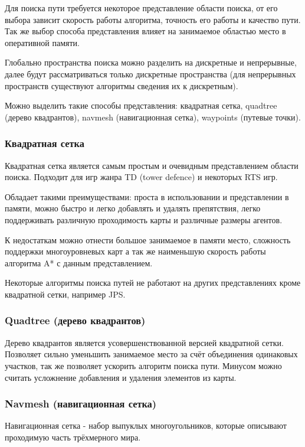 Для поиска пути требуется некоторое представление области поиска, от его выбора зависит скорость работы алгоритма, точность его работы и качество пути. Так же выбор способа представления влияет на занимаемое областью место в оперативной памяти. 

Глобально пространства поиска можно разделить на дискретные и непрерывные, далее будут рассматриваться только дискретные пространства (для непрерывных пространств существуют алгоритмы сведения их к дискретным).  

Можно выделить такие способы представления: квадратная сетка, quadtree (дерево квадрантов), navmesh (навигационная сетка), waypoints (путевые точки).

\subsubsection{Квадратная сетка}

Квадратная сетка является самым простым и очевидным представлением области поиска. Подходит для игр жанра TD (tower defence) и некоторых RTS игр. 

Обладает такими преимуществами: проста в использовании и представлении в памяти, можно быстро и легко добавлять и удалять препятствия, легко поддерживать различную проходимость карты и различные размеры агентов. 

К недостаткам можно отнести большое занимаемое в памяти место, сложность поддержки многоуровневых карт а так же наименьшую скорость работы алгоритма A* с данным представлением. 

Некоторые алгоритмы поиска путей не работают на других представлениях кроме квадратной сетки, например JPS.

\subsubsection{Quadtree (дерево квадрантов)}

Дерево квадрантов является усовершенствованной версией квадратной сетки. Позволяет сильно уменьшить занимаемое место за счёт объединения одинаковых участков, так же позволяет ускорить алгоритм поиска пути. Минусом можно считать усложнение добавления и удаления элементов из карты.

\subsubsection{Navmesh (навигационная сетка)}

Навигационная сетка - набор выпуклых многоугольников, которые описывают проходимую часть трёхмерного мира. 

